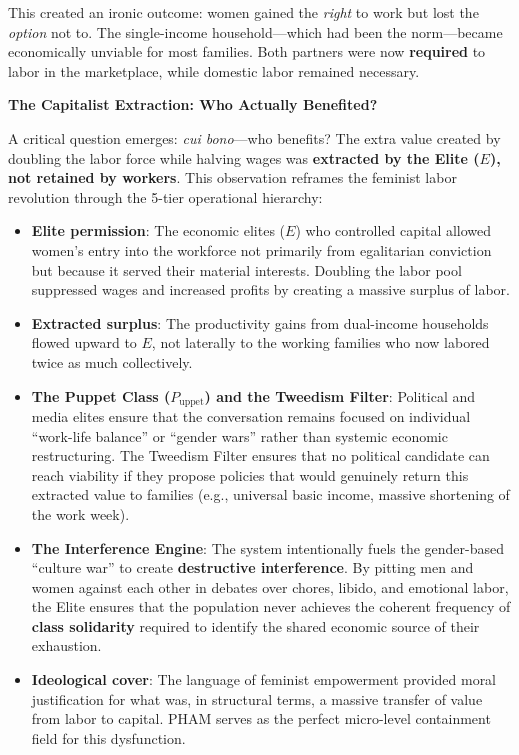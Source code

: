 \documentclass[12pt, letterpaper]{article}
\begin{document}
This created an ironic outcome: women gained the \textit{right} to work but lost the \textit{option} not to. The single-income household---which had been the norm---became economically unviable for most families. Both partners were now \textbf{required} to labor in the marketplace, while domestic labor remained necessary.

\textbf{The Capitalist Extraction: Who Actually Benefited?}

A critical question emerges: \textit{cui bono}---who benefits? The extra value created by doubling the labor force while halving wages was \textbf{extracted by the Elite ($E$), not retained by workers}. This observation reframes the feminist labor revolution through the 5-tier operational hierarchy:

\begin{itemize}
    \item \textbf{Elite permission}: The economic elites ($E$) who controlled capital allowed women's entry into the workforce not primarily from egalitarian conviction but because it served their material interests. Doubling the labor pool suppressed wages and increased profits by creating a massive surplus of labor.
    
    \item \textbf{Extracted surplus}: The productivity gains from dual-income households flowed upward to $E$, not laterally to the working families who now labored twice as much collectively.
    
    \item \textbf{The Puppet Class ($P_{\text{uppet}}$) and the Tweedism Filter}: Political and media elites ensure that the conversation remains focused on individual ``work-life balance'' or ``gender wars'' rather than systemic economic restructuring. The Tweedism Filter ensures that no political candidate can reach viability if they propose policies that would genuinely return this extracted value to families (e.g., universal basic income, massive shortening of the work week).
    
    \item \textbf{The Interference Engine}: The system intentionally fuels the gender-based ``culture war'' to create \textbf{destructive interference}. By pitting men and women against each other in debates over chores, libido, and emotional labor, the Elite ensures that the population never achieves the coherent frequency of \textbf{class solidarity} required to identify the shared economic source of their exhaustion.
    
    \item \textbf{Ideological cover}: The language of feminist empowerment provided moral justification for what was, in structural terms, a massive transfer of value from labor to capital. PHAM serves as the perfect micro-level containment field for this dysfunction.
\end{itemize}
\end{document}
